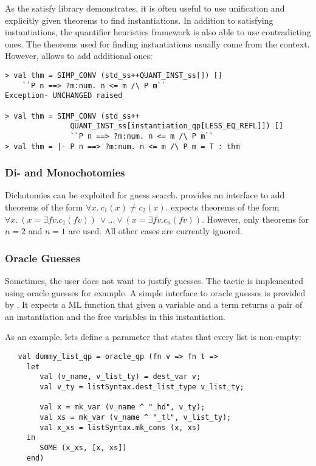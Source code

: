 As the satisfy library demonstrates, it is often
useful to use unification and explicitly given theorems to
find instantiations. In addition to satisfying instantiations, the quantifier heuristics framework
is also able to use contradicting ones. The theorems used for finding instantiations usually come from
the context. However,  allows to add additional ones:

\begin{session}
\begin{verbatim}
> val thm = SIMP_CONV (std_ss++QUANT_INST_ss[]) []
    ``P n ==> ?m:num. n <= m /\ P m``
Exception- UNCHANGED raised

> val thm = SIMP_CONV (std_ss++
               QUANT_INST_ss[instantiation_qp[LESS_EQ_REFL]]) []
               ``P n ==> ?m:num. n <= m /\ P m``
> val thm = |- P n ==> ?m:num. n <= m /\ P m = T : thm
\end{verbatim}
\end{session}

\subsubsection{Di- and Monochotomies}

Dichotomies can be exploited for guess search.
 provides an interface to add theorems
of the form $\forall x.\ c_1(x) \neq c_2(x)$.
 expects theorems of the form
$\forall x. \ (x = \exists \textit{fv}. c_1(\textit{fv}))\ \vee \ldots \vee (x = \exists \textit{fv}. c_n(\textit{fv}))$.
However, only theorems for $n = 2$ and $n = 1$ are used. All other cases are currently ignored.

\subsubsection{Oracle Guesses}

Sometimes, the user does not want to justify guesses. The tactic
 is implemented using oracle guesses for example.
A simple interface to oracle guesses is provided by .
It expects a ML function that given a variable and a term returns
a pair of an instantiation and the free variables in this instantiation.

As an example, lets define a parameter that states that every list is non-empty:
\begin{verbatim}
   val dummy_list_qp = oracle_qp (fn v => fn t =>
     let
        val (v_name, v_list_ty) = dest_var v;
        val v_ty = listSyntax.dest_list_type v_list_ty;

        val x = mk_var (v_name ^ "_hd", v_ty);
        val xs = mk_var (v_name ^ "_tl", v_list_ty);
        val x_xs = listSyntax.mk_cons (x, xs)
     in
        SOME (x_xs, [x, xs])
     end)
\end{verbatim}

